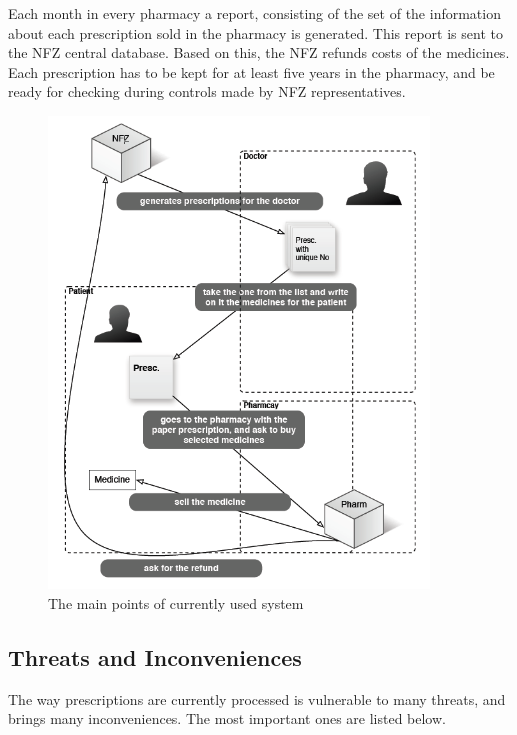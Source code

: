 Each month in every pharmacy a report, consisting of the set of the information about each prescription sold in the pharmacy is generated. This report is sent to the NFZ central database. Based on this, the NFZ refunds costs of the medicines. Each prescription has to be kept for at least five years in the pharmacy, and be ready for checking during controls made by NFZ representatives.
\clearpage
\begin{figure}[h]
	\centering
	\includegraphics[width=0.9\textwidth]{database/current_uml.png}
	\caption{The main points of currently used system}
	\label{fig:F1}
\end{figure}

\subsection{Threats and Inconveniences}
The way prescriptions are currently processed is vulnerable to many threats, and brings many inconveniences. The most important ones are listed below.

